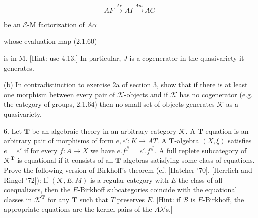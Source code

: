 $$AF \xrightarrow{Ae} AI \xrightarrow{Am} AG$$

be an $\mathcal{E}$-M factorization of $A\alpha$

whose evaluation map (2.1.60)

is in M. [Hint: use 4.13.] In particular, $J$ is a cogenerator in the quasivariety it generates.

(b) In contradistinction to exercise 2a of section 3, show that if there is at least one morphism between every pair of $\mathcal{K}$-objects and if $\mathcal{K}$ has no cogenerator (e.g. the category of groups, 2.1.64) then no small set of objects generates $\mathcal{K}$ as a quasivariety.

6. Let $\mathbf{T}$ be an algebraic theory in an arbitrary category $\mathcal{K}$. A $\mathbf{T}$-equation is an arbitrary pair of morphisms of form $e, e' : K \longrightarrow AT$. A $\mathbf{T}$-algebra $(X, \xi)$ satisfies $e = e'$ if for every $f : A \longrightarrow X$ we have $e.f^{\#} = e'.f^{\#}$. A full replete subcategory of $\mathcal{K}^{\mathbf{T}}$ is equational if it consists of all $\mathbf{T}$-algebras satisfying some class of equations. Prove the following version of Birkhoff’s theorem (cf. [Hatcher ’70], [Herrlich and Ringel ’72]): If $(\mathcal{K}, E, M)$ is a regular category with $E$ the class of all coequalizers, then the $E$-Birkhoff subcategories coincide with the equational classes in $\mathcal{K}^{\mathbf{T}}$ for any $\mathbf{T}$ such that $T$ preserves $E$. [Hint: if $\mathcal{B}$ is $E$-Birkhoff, the appropriate equations are the kernel pairs of the $A\lambda'$s.]

